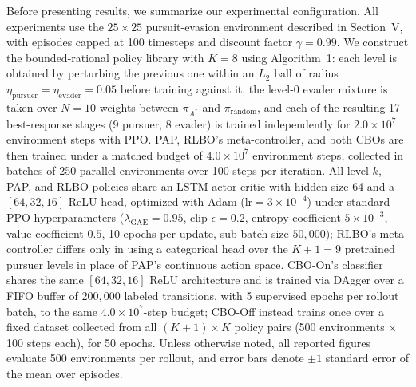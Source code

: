 
Before presenting results, we summarize our experimental configuration.
All experiments use the $25\times25$ pursuit-evasion environment described
in Section~V, with episodes capped at 100 timesteps and discount factor
$\gamma=0.99$. We construct the bounded-rational policy library with
$K{=}8$ using Algorithm~1: each level is obtained by perturbing the
previous one within an $L_2$ ball of radius
$\eta_{\text{pursuer}}=\eta_{\text{evader}}=0.05$ before training against
it, the level-0 evader mixture is taken over $N{=}10$ weights between
$\pi_{A^*}$ and $\pi_{\text{random}}$, and each of the resulting 17
best-response stages (9 pursuer, 8 evader) is trained independently for
$2.0\times10^7$ environment steps with PPO. PAP, RLBO's meta-controller,
and both CBOs are then trained under a matched budget of
$4.0\times10^7$ environment steps, collected in batches of 250 parallel
environments over 100 steps per iteration. All level-$k$, PAP, and RLBO
policies share an LSTM actor-critic with hidden size 64 and a $[64,32,16]$
ReLU head, optimized with Adam ($\text{lr}=3\times10^{-4}$) under standard
PPO hyperparameters ($\lambda_{\text{GAE}}=0.95$, clip $\epsilon=0.2$,
entropy coefficient $5\times10^{-3}$, value coefficient $0.5$, 10 epochs
per update, sub-batch size $50{,}000$); RLBO's meta-controller differs only
in using a categorical head over the $K{+}1{=}9$ pretrained pursuer levels
in place of PAP's continuous action space. CBO-On's classifier shares the
same $[64,32,16]$ ReLU architecture and is trained via DAgger over a FIFO
buffer of $200{,}000$ labeled transitions, with 5 supervised epochs per
rollout batch, to the same $4.0\times10^7$-step budget; CBO-Off instead
trains once over a fixed dataset collected from all $(K{+}1)\times K$
policy pairs (500 environments $\times$ 100 steps each), for 50 epochs.
Unless otherwise noted, all reported figures evaluate 500 environments per
rollout, and error bars denote $\pm1$ standard error of the mean over
episodes.
